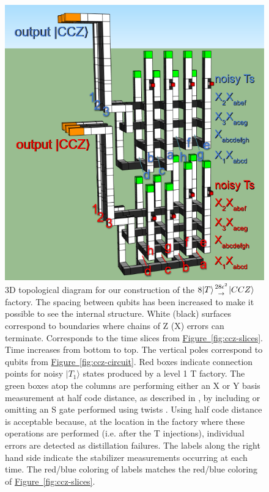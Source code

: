 \documentclass[twocolumn,accepted=2019-03-30]{quantumarticle}
\newcommand{\fig}[1]{\hyperref[fig:#1]{Figure~\ref*{fig:#1}}}
\newcommand{\factory}[3]{$#1 \genfrac{}{}{0pt}{}{#2}{\rightarrow} {#3}$ factory}
\begin{document}
\begin{figure}
  \label{fig:ccz-3d}
  \includegraphics[width=\textwidth,height=\dimexpr\textheight-14\baselineskip,keepaspectratio]{ccz-3d.png}
  \caption{
    3D topological diagram for our construction of the \factory{8|T\rangle}{28\epsilon^2}{|CCZ\rangle}.
    The spacing between qubits has been increased to make it possible to see the internal structure.
    White (black) surfaces correspond to boundaries where chains of Z (X) errors can terminate.
    Corresponds to the time slices from \fig{ccz-slices}.
    Time increases from bottom to top.
    The vertical poles correspond to qubits from \fig{ccz-circuit}.
    Red boxes indicate connection points for noisy $|T_1\rangle$ states produced by a level 1 T factory.
    The green boxes atop the columns are performing either an X or Y basis measurement at half code distance, as described in \cite{fowler2018}, by including or omitting an S gate performed using twists \cite{brown2017poking}.
    Using half code distance is acceptable because, at the location in the factory where these operations are performed (i.e. after the T injections), individual errors are detected as distillation failures.
    The labels along the right hand side indicate the stabilizer measurements occurring at each time.
    The red/blue coloring of labels matches the red/blue coloring of \fig{ccz-slices}.
}
\end{figure}
\end{document}
